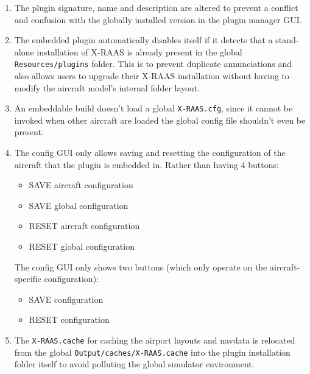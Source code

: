 \documentclass[a4paper,12pt]{article}
\begin{document}
\begin{enumerate}

\item The plugin signature, name and description are altered to prevent a
conflict and confusion with the globally installed version in the plugin
manager GUI.

\item The embedded plugin automatically disables itself if it detects
that a stand-alone installation of X-RAAS is already present in the
global \texttt{Resources/plugins} folder. This is to prevent duplicate
annunciations and also allows users to upgrade their X-RAAS installation
without having to modify the aircraft model's internal folder layout.

\item An embeddable build doesn't load a global \texttt{X-RAAS.cfg},
since it cannot be invoked when other aircraft are loaded the global
config file shouldn't even be present.

\item The config GUI only allows saving and resetting the configuration
of the aircraft that the plugin is embedded in. Rather than having 4
buttons:

\begin{itemize}

\item SAVE aircraft configuration

\item SAVE global configuration

\item RESET aircraft configuration

\item RESET global configuration

\end{itemize}

The config GUI only shows two buttons (which only operate on the
aircraft-specific configuration):

\begin{itemize}

\item SAVE configuration

\item RESET configuration

\end{itemize}

\item The \texttt{X-RAAS.cache} for caching the airport layouts and
navdata is relocated from the global \texttt{Output/caches/X-RAAS.cache}
into the plugin installation folder itself to avoid polluting the
global simulator environment.

\end{enumerate}
\end{document}
